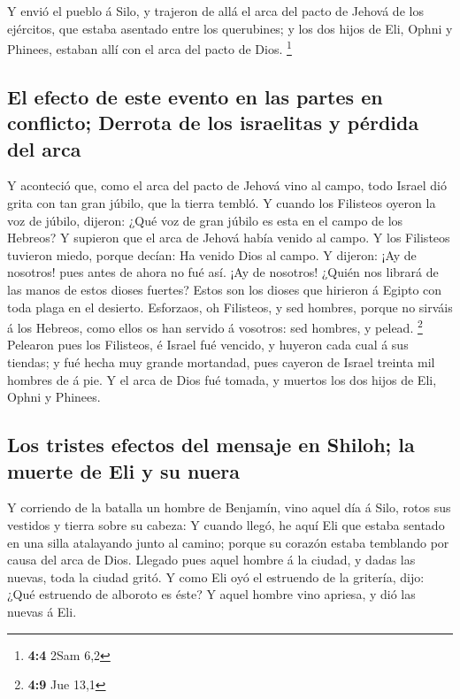  Y envió el pueblo á Silo, y trajeron de allá el arca del
pacto de Jehová de los ejércitos, que estaba asentado entre los
querubines; y los dos hijos de Eli, Ophni y Phinees, estaban allí con el
arca del pacto de Dios. \footnote{\textbf{4:4} 2Sam 6,2}

\hypertarget{el-efecto-de-este-evento-en-las-partes-en-conflicto-derrota-de-los-israelitas-y-puxe9rdida-del-arca}{%
\subsection{El efecto de este evento en las partes en conflicto; Derrota
de los israelitas y pérdida del
arca}\label{el-efecto-de-este-evento-en-las-partes-en-conflicto-derrota-de-los-israelitas-y-puxe9rdida-del-arca}}

 Y aconteció que, como el arca del pacto de Jehová vino al
campo, todo Israel dió grita con tan gran júbilo, que la tierra tembló.
 Y cuando los Filisteos oyeron la voz de júbilo, dijeron:
¿Qué voz de gran júbilo es esta en el campo de los Hebreos? Y supieron
que el arca de Jehová había venido al campo.  Y los
Filisteos tuvieron miedo, porque decían: Ha venido Dios al campo. Y
dijeron: ¡Ay de nosotros! pues antes de ahora no fué así. 
¡Ay de nosotros! ¿Quién nos librará de las manos de estos dioses
fuertes? Estos son los dioses que hirieron á Egipto con toda plaga en el
desierto.  Esforzaos, oh Filisteos, y sed hombres, porque
no sirváis á los Hebreos, como ellos os han servido á vosotros: sed
hombres, y pelead. \footnote{\textbf{4:9} Jue 13,1} 
Pelearon pues los Filisteos, é Israel fué vencido, y huyeron cada cual á
sus tiendas; y fué hecha muy grande mortandad, pues cayeron de Israel
treinta mil hombres de á pie.  Y el arca de Dios fué
tomada, y muertos los dos hijos de Eli, Ophni y Phinees.

\hypertarget{los-tristes-efectos-del-mensaje-en-shiloh-la-muerte-de-eli-y-su-nuera}{%
\subsection{Los tristes efectos del mensaje en Shiloh; la muerte de Eli
y su
nuera}\label{los-tristes-efectos-del-mensaje-en-shiloh-la-muerte-de-eli-y-su-nuera}}

 Y corriendo de la batalla un hombre de Benjamín, vino
aquel día á Silo, rotos sus vestidos y tierra sobre su cabeza:
 Y cuando llegó, he aquí Eli que estaba sentado en una
silla atalayando junto al camino; porque su corazón estaba temblando por
causa del arca de Dios. Llegado pues aquel hombre á la ciudad, y dadas
las nuevas, toda la ciudad gritó.  Y como Eli oyó el
estruendo de la gritería, dijo: ¿Qué estruendo de alboroto es éste? Y
aquel hombre vino apriesa, y dió las nuevas á Eli.

